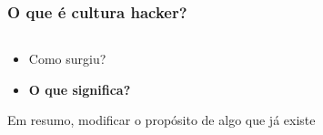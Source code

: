 \documentclass{beamer}
\begin{document}
\begin{frame}
  \frametitle{O que é cultura hacker?}
  \begin{columns}
    \begin{column}{0.5\textwidth}
      \begin{itemize}
        \item Como surgiu?
        \item \textbf{O que significa?}
      \end{itemize}
      Em resumo, modificar o propósito de algo que já existe
      \vspace*{3\baselineskip}
    \end{column}
    \begin{column}{0.5\textwidth}
    \end{column}
  \end{columns}
\end{frame}
\end{document}
